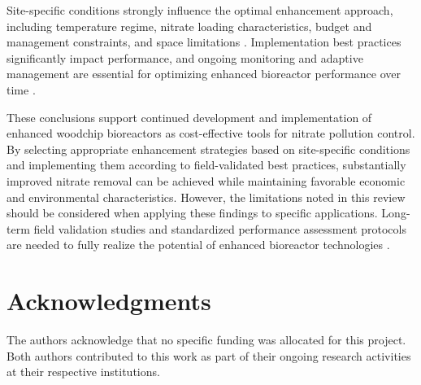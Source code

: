\documentclass[12pt,a4paper]{article}
\begin{document}
Site-specific conditions strongly influence the optimal enhancement approach, including temperature regime, nitrate loading characteristics, budget and management constraints, and space limitations \citep{RN310}. Implementation best practices significantly impact performance, and ongoing monitoring and adaptive management are essential for optimizing enhanced bioreactor performance over time \citep{RN310, RN312}.

These conclusions support continued development and implementation of enhanced woodchip bioreactors as cost-effective tools for nitrate pollution control. By selecting appropriate enhancement strategies based on site-specific conditions and implementing them according to field-validated best practices, substantially improved nitrate removal can be achieved while maintaining favorable economic and environmental characteristics. However, the limitations noted in this review should be considered when applying these findings to specific applications. Long-term field validation studies and standardized performance assessment protocols are needed to fully realize the potential of enhanced bioreactor technologies \citep{RN625, RN310}.

\section{Acknowledgments}

The authors acknowledge that no specific funding was allocated for this project. Both authors contributed to this work as part of their ongoing research activities at their respective institutions.



\end{document}
